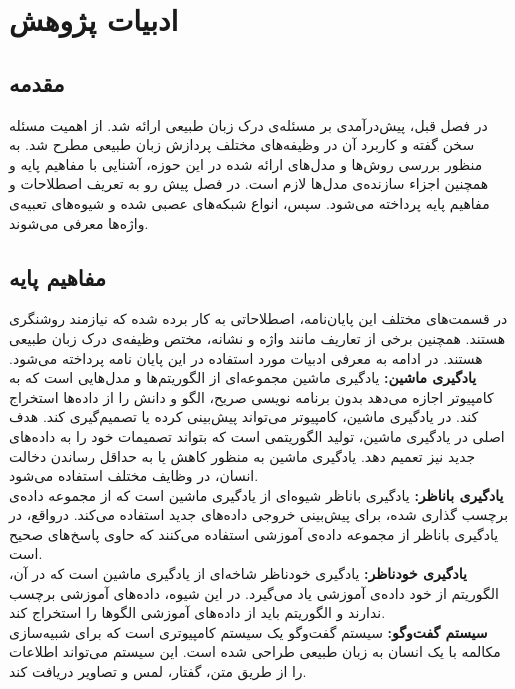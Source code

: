 \chapter{ادبیات پژوهش}
\pagebreak
\section{مقدمه}
در فصل قبل، پیش‌درآمدی بر مسئله‌ی درک زبان طبیعی ارائه شد. از اهمیت مسئله سخن گفته و کاربرد آن در وظیفه‌های مختلف پردازش زبان طبیعی مطرح شد. به منظور بررسی روش‌ها و مدل‌های ارائه شده در این حوزه، آشنایی با مفاهیم پایه و همچنین اجزاء سازنده‌ی مدل‌ها لازم است. در فصل پیش رو به تعریف اصطلاحات و مفاهیم پایه پرداخته می‌شود. سپس، انواع شبکه‌های عصبی شده و شیوه‌های تعبیه‌ی واژه‌ها  معرفی می‌شوند.

\section{مفاهیم پایه}
در قسمت‌های مختلف این پایان‌نامه، اصطلاحاتی به کار برده شده که نیازمند روشنگری هستند. همچنین برخی از تعاریف مانند واژه و نشانه، مختص وظیفه‌ی درک زبان طبیعی هستند. در ادامه به معرفی ادبیات مورد استفاده در  این پایان نامه پرداخته می‌شود.
\textbf{یادگیری ماشین:}
یادگیری ماشین مجموعه‌ای از الگوریتم‌ها و مدل‌هایی است که به کامپیوتر اجازه می‌دهد بدون برنامه نویسی صریح، الگو و دانش را از داده‌ها استخراج کند. در یادگیری ماشین، کامپیوتر می‌تواند پیش‌بینی کرده یا تصمیم‌گیری کند. هدف اصلی در یادگیری ماشین، تولید الگوریتمی است که بتواند تصمیمات خود را به داده‌های جدید نیز تعمیم دهد. یادگیری ماشین به منظور کاهش یا به حداقل رساندن دخالت انسان، در وظایف مختلف استفاده می‌شود.
\\
\textbf{یادگیری باناظر:}
یادگیری باناظر شیوه‌ای از یادگیری ماشین است که از مجموعه داده‌ی برچسب گذاری شده، برای پیش‌بینی خروجی داده‌های جدید استفاده می‌کند. درواقع، در یادگیری باناظر از مجموعه داده‌ی آموزشی استفاده می‌کنند که حاوی پاسخ‌های صحیح است.
\\
\textbf{یادگیری خودناظر:}
یادگیری خودناظر شاخه‌ای از یادگیری ماشین است که در آن، الگوریتم از خود داده‌ی آموزشی یاد می‌گیرد. در این شیوه، داده‌های آموزشی برچسب ندارند و الگوریتم باید از داده‌های آموزشی الگوها را استخراج کند.
\\
\textbf{سیستم گفت‌وگو:}
سیستم گفت‌وگو یک سیستم کامپیوتری است که برای شبیه‌سازی مکالمه با یک انسان به زبان طبیعی طراحی شده است. این سیستم می‌تواند اطلاعات را از طریق متن، گفتار، لمس و تصاویر دریافت کند.
\\
